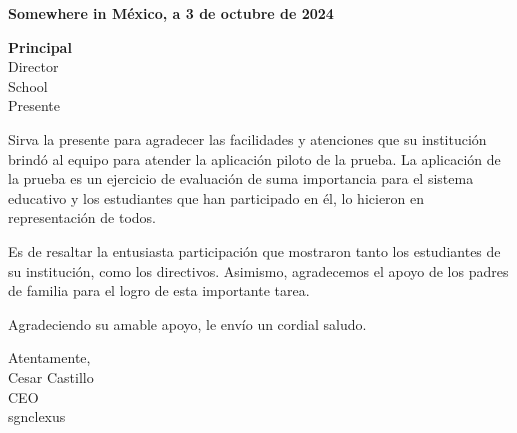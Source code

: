 \documentclass[letterpaper]{letter}
\begin{document}
\large

\vspace*{.5cm}  %

\begin{flushright}    
    \textbf{Somewhere in México, a 3 de octubre de 2024}   
\end{flushright} 
\vspace{3\baselineskip}
\textbf{{{Principal}} } \\
Director \\ 
{{School}} \\
Presente 

Sirva la presente para agradecer las facilidades y atenciones que su institución brindó al equipo para atender la aplicación piloto de la prueba. La aplicación de la prueba es un ejercicio de evaluación de suma importancia para el sistema educativo y los estudiantes que han participado en él, lo hicieron en representación de todos.

Es de resaltar la entusiasta participación que mostraron tanto los estudiantes de su institución, como los directivos. Asimismo, agradecemos el apoyo de los padres de familia para el logro de esta importante tarea.

Agradeciendo su amable apoyo, le envío un cordial saludo. 

\vspace{1\baselineskip}
\begin{center}
    Atentamente, \\    
    \vspace{1\baselineskip}
    \vspace{1\baselineskip}
    Cesar Castillo \\ 
    CEO \\ 
    sgnclexus \\    
\end{center}
\end{document}
